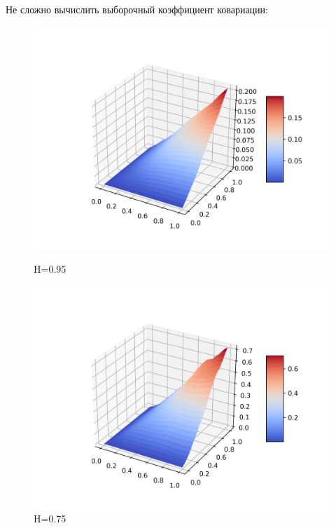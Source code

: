 \documentclass[a4paper,12pt]{article}
\numberwithin{equation}{section}
\begin{document}
	Не сложно вычислить выборочный коэффициент ковариации:
	\begin{figure}[H]
		\includegraphics[scale=0.4]{covariance-1-95.png}
		\caption{H=0.95}
		\endminipage\hfill
		\includegraphics[scale=0.4]{covariance-1-75.png}
		\caption{H=0.75}
		\endminipage\hfill
	\end{figure}
	
\end{document}
